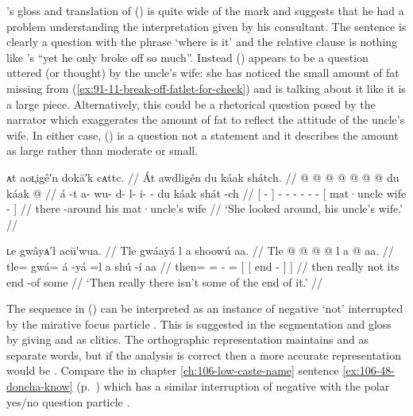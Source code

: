 \citeauthor{swanton:1909}’s gloss and translation of (\lastx) is quite wide of the mark and suggests that he had a problem understanding the interpretation given by his consultant.
The sentence is clearly a question with the phrase  ‘where is it’ and the relative clause is nothing like \citeauthor{swanton:1909}’s “yet he only broke off so much”.
Instead (\lastx) appears to be a question uttered (or thought) by the uncle’s wife: she has noticed the small amount of fat missing from (\ref{ex:91-11-break-off-fatlet-for-cheek}) and is talking about it like it is a large piece.
Alternatively, this could be a rhetorical question posed by the narrator which exaggerates the amount of fat to reflect the attitude of the uncle’s wife.
In either case, (\lastx) is a question not a statement and it describes the amount as large rather than moderate or small.

\ex\label{ex:91-13-she-looked-around-uncles-wife}%
%
\begingl
	\glpreamble	ᴀt aoʟ̣igê′n dokā′k cᴀttc. //
	\glpreamble	Át awdlig̱én du káak shátch. //
	\gla	{}  @ {} {}  @ {} @ {} @ {} @ {} @ {} @ {}
		{} du káak  @ {} {} //
	\glb	{} á -t {} a- wu- d- l- i-  -
		{} du káak shát -ch {} //
	\glc	{}[  - {}] - - - - -  -
		{}[  mat·uncle wife - {}] //
	\gld	{} there -around {}  {} {} {} {} {} {}
		{} his mat·uncle’s wife {} {} //
	\glft	‘She looked around, his uncle’s wife.’
		//
\endgl
\xe

\ex\label{ex:91-14-end-of-it-isnt}%
%
\begingl
	\glpreamble	ʟe gwâyᴀ′ł acū′wua. //
	\glpreamble	Tle gwáayá l a shoowú aa. //
	\gla	Tle @  @ {} @ {} @ \•l {} {} a  @ {} {} aa. {} //
	\glb	tle= gwá= á -yá =l {} {} a shú -í {} aa {} //
	\glc	then= =  - =
		{}[\pr{DP} {}[  end - {}]  {}] //
	\gld	then really\•  {} \•not {} {} its end -of {} some {} //
	\glft	‘Then really there isn’t some of the end of it.’
		//
\endgl
\xe

The sequence  in (\lastx) can be interpreted as an instance of negative  ‘not’ interrupted by the mirative focus particle .
This is suggested in the segmentation and gloss by giving  and  as clitics.
The orthographic representation maintains  and  as separate words, but if the analysis is correct then a more accurate representation would be .
Compare the  in chapter \ref{ch:106-low-caste-name} sentence \ref{ex:106-48-doncha-know} (p.\ \pageref{ex:106-48-doncha-know}) which has a similar interruption of negative  with the polar yes/no question particle . 

